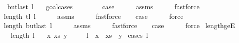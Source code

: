 \begin{isabellebody}
\ \ \ \ {\isachardoublequoteopen}butlast\ l\ {\isasymnoteq}\ {\isacharbrackleft}{\kern0pt}{\isacharbrackright}{\kern0pt}{\isachardoublequoteclose}\isanewline
%
\isadelimproof
%
\endisadelimproof
%
\isatagproof
{}\isamarkupfalse%
\ {\isacharparenleft}{\kern0pt}goal{\isacharunderscore}{\kern0pt}cases{\isacharparenright}{\kern0pt}\isanewline
\ \ \isamarkupfalse%
\ {}\isanewline
\ \ \isamarkupfalse%
\ {\isacharquery}{\kern0pt}case\isanewline
\ \ \ \ \isamarkupfalse%
\ assms\isanewline
\ \ \ \ \isamarkupfalse%
\ fastforce\isanewline
{}\isamarkupfalse%
\isanewline
\ \ \isamarkupfalse%
\ {}\isanewline
\ \ \isamarkupfalse%
\ {\isachardoublequoteopen}{}\ {\isasymle}\ length\ {\isacharparenleft}{\kern0pt}tl\ l{\isacharparenright}{\kern0pt}{\isachardoublequoteclose}\isanewline
\ \ \ \ \isamarkupfalse%
\ assms\isanewline
\ \ \ \ \isamarkupfalse%
\ fastforce\isanewline
\ \ \isamarkupfalse%
\ {\isacharquery}{\kern0pt}case\isanewline
\ \ \ \ \isamarkupfalse%
\ force\isanewline
{}\isamarkupfalse%
\isanewline
\ \ \isamarkupfalse%
\ {}\isanewline
\ \ \isamarkupfalse%
\ {\isachardoublequoteopen}{}\ {\isasymle}\ length\ {\isacharparenleft}{\kern0pt}butlast\ l{\isacharparenright}{\kern0pt}{\isachardoublequoteclose}\isanewline
\ \ \ \ \isamarkupfalse%
\ assms\isanewline
\ \ \ \ \isamarkupfalse%
\ fastforce\isanewline
\ \ \isamarkupfalse%
\ {\isacharquery}{\kern0pt}case\isanewline
\ \ \ \ \isamarkupfalse%
\ force\isanewline
{}\isamarkupfalse%
%
\endisatagproof
{\isafoldproof}%
%
\isadelimproof
\isanewline
%
\endisadelimproof
\isanewline
{}\isamarkupfalse%
\ length{\isacharunderscore}{\kern0pt}ge{\isacharunderscore}{\kern0pt}{}E{\isacharcolon}{\kern0pt}\isanewline
\ \ \ {\isachardoublequoteopen}{}\ {\isasymle}\ length\ l{\isachardoublequoteclose}\isanewline
\ \ \ x\ xs\ y\ \isanewline
\ \ \ \ {\isachardoublequoteopen}l\ {\isacharequal}{\kern0pt}\ x\ {\isacharhash}{\kern0pt}\ xs\ {\isacharat}{\kern0pt}\ {\isacharbrackleft}{\kern0pt}y{\isacharbrackright}{\kern0pt}{\isachardoublequoteclose}\isanewline
%
\isadelimproof
%
\endisadelimproof
%
\isatagproof
{}\isamarkupfalse%
\ {\isacharparenleft}{\kern0pt}cases\ l{\isacharparenright}{\kern0pt}\isanewline

\end{isabellebody}
